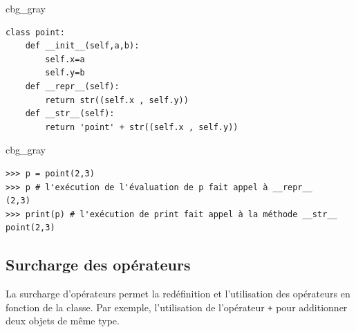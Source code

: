 \documentclass[%
oneside,                 %
final,                   %
10pt]{article}
\newenvironment{_cod_tight}[1]{
   \def\FrameCommand{\colorbox{#1}}
   \FrameRule0.6pt\MakeFramed {\FrameRestore}\vskip3mm}
   {\vskip0mm\endMakeFramed}
\newenvironment{cod}[1]{
\bgroup\rmfamily
\fboxsep=0mm\relax
\begin{_cod_tight}{#1}
\list{}{\parsep=-2mm\parskip=0mm\topsep=0pt\leftmargin=2mm
\rightmargin=2\leftmargin\leftmargin=4pt\relax}
\item\relax}
{\endlist\end{_cod_tight}\egroup}
\begin{document}
\begin{cod}{cbg_gray}\begin{verbatim}
class point:
    def __init__(self,a,b):
        self.x=a
        self.y=b
    def __repr__(self):
        return str((self.x , self.y))
    def __str__(self):
        return 'point' + str((self.x , self.y))
\end{verbatim}
\end{cod}
\noindent

\begin{cod}{cbg_gray}\begin{verbatim}
>>> p = point(2,3)
>>> p # l'exécution de l'évaluation de p fait appel à __repr__
(2,3)
>>> print(p) # l'exécution de print fait appel à la méthode __str__
point(2,3)
\end{verbatim}
\end{cod}
\noindent

\subsection{Surcharge des opérateurs}
La surcharge d'opérateurs permet la redéfinition et l'utilisation des opérateurs en fonction de la classe. Par exemple, l'utilisation de l'opérateur \texttt{+} pour additionner deux objets de même type.
\end{document}
